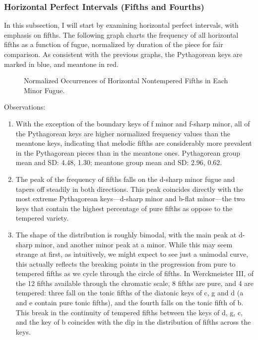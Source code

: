     \subsubsection{Horizontal Perfect Intervals (Fifths and
Fourths)}\label{horizontal-perfect-intervals-fifths-and-fourths}

In this subsection, I will start by examining horizontal perfect
intervals, with emphasis on fifths. The following graph charts the
frequency of all horizontal fifths as a function of fugue, normalized by
duration of the piece for fair comparison. As consistent with the
previous graphs, the Pythagorean keys are marked in blue, and meantone
in red.




\begin{figure}[H]
    \begin{center}
    \caption{Normalized Occurrences of Horizontal Nontempered Fifths in Each Minor Fugue. }
    \end{center}
\end{figure}
    
    Observations:

\begin{enumerate}
\def\labelenumi{\arabic{enumi}.}
\tightlist
\item
  With the exception of the boundary keys of f minor and f-sharp minor,
  all of the Pythagorean keys are higher normalized frequency values
  than the meantone keys, indicating that melodic fifths are
  considerably more prevalent in the Pythagorean pieces than in the
  meantone ones. Pythagorean group mean and SD: 4.48, 1.30; meantone
  group mean and SD: 2.96, 0.62.
\item
  The peak of the frequency of fifths falls on the d-sharp minor fugue
  and tapers off steadily in both directions. This peak coincides
  directly with the most extreme Pythagorean keys---d-sharp minor
  and b-flat minor---the two keys that contain the highest
  percentage of pure fifths as oppose to the tempered variety.
\item
  The shape of the distribution is roughly bimodal, with the main peak
  at d-sharp minor, and another minor peak at a minor. While this may
  seem strange at first, as intuitively, we might expect to see just a
  unimodal curve, this actually reflects the breaking points in the
  progression from pure to tempered fifths as we cycle through the
  circle of fifths. In Werckmeister III, of the 12 fifths available
  through the chromatic scale, 8 fifths are pure, and 4 are tempered:
  three fall on the tonic fifths of the diatonic keys of c, g and d (a
  and e contain pure tonic fifths), and the fourth falls on the tonic
  fifth of b. This break in the continuity of tempered fifths between
  the keys of d, g, c, and the key of b coincides with the dip in the
  distribution of fifths across the keys.
\end{enumerate}

